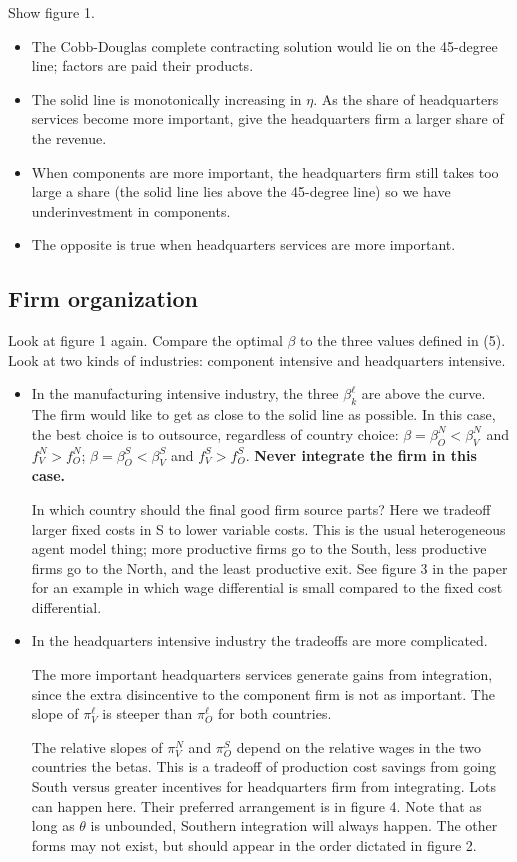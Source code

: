 \documentclass[11pt, pdftex]{article}
\begin{document}
Show figure 1.
\begin{itemize}
\item The Cobb-Douglas complete contracting solution would lie on the 45-degree line; factors are paid their products.
\item The solid line is monotonically increasing in $\eta$. As the share of headquarters services become more important, give the headquarters firm a larger share of the revenue.

\item When components are more important, the headquarters firm still takes too large a share (the solid line lies above the 45-degree line) so we have underinvestment in components.

\item The opposite is true when headquarters services are more important.
\end{itemize}
\subsection{Firm organization}
Look at figure 1 again. Compare the optimal $\beta$ to the three values defined in (5). Look at two kinds of industries: component intensive and headquarters intensive.
\begin{itemize}
\item In the manufacturing intensive industry, the three $\beta_k^\ell$ are above the curve. The firm would like to get as close to the solid line as possible. In this case, the best choice is to outsource, regardless of country choice: $\beta = \beta^N_O < \beta^N_V$ and $f_V^N > f_O^N$; $\beta = \beta^S_O < \beta^S_V$ and $f_V^S > f_O^S$. \textbf{Never integrate the firm in this case.}

    In which country should the final good firm source parts? Here we tradeoff larger fixed costs in S to lower variable costs. This is the usual heterogeneous agent model thing; more productive firms go to the South, less productive firms go to the North, and the least productive exit. See figure 3 in the paper for an example in which wage differential is small compared to the fixed cost differential.

\item In the headquarters intensive industry the tradeoffs are more complicated.

The more important headquarters services generate gains from integration, since the extra disincentive to the component firm is not as important. The slope of $\pi_V^\ell$ is steeper than $\pi_O^\ell$ for both countries.

The relative slopes of $\pi^N_V$ and $\pi^S_O$ depend on the relative wages in the two countries the betas. This is a tradeoff of production cost savings from going South versus greater incentives for headquarters firm from integrating.
Lots can happen here. Their preferred arrangement is in figure 4. Note that as long as $\theta$ is unbounded, Southern integration will always happen. The other forms may not exist, but should appear in the order dictated in figure 2.

\end{itemize}
\end{document}
